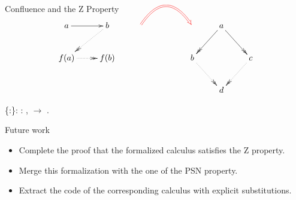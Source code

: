 \documentclass[10pt]{beamer}
\begin{document}
\begin{frame}[fragile]{Confluence and the Z Property}  
  \[
    \xymatrix{
      a \ar[r] &  b \ar@{.>>}[dl] & \ar@/^2.0pc/@{=>}@[red][rr] & &    & a \ar@{->>}[dl] \ar@{->>}[dr] & \\ 
      f(a) \ar@{.>>}[r] & f(b) & & &   b \ar@{.>>}[dr] &  & c \ar@{.>>}[dl] \\
      & & & &       & d & 
            }
  \]
  
  \begin{coqdoccode}
      \{:\}: \coqdockw{\ensuremath{\forall}} :  ,   \ensuremath{\rightarrow}  .\coqdoceol
  \end{coqdoccode}
\end{frame}

\begin{frame}[fragile]{Future work}
  \begin{itemize}
  \item Complete the proof that the formalized calculus satisfies the
    Z property.
  \item Merge this formalization with the one of the PSN property.
  \item Extract the code of the corresponding calculus with explicit substitutions.
  \end{itemize}
\end{frame}



\end{document}
